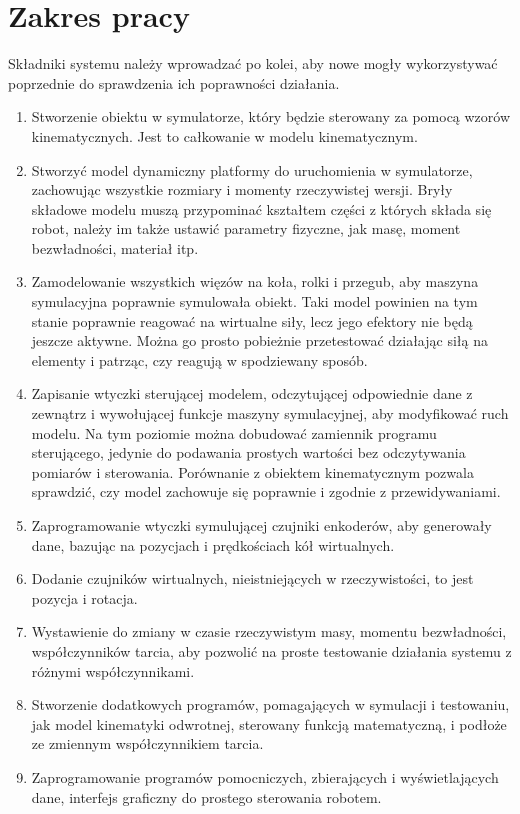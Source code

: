 \section{Zakres pracy}
	Składniki systemu należy wprowadzać po kolei, aby nowe mogły wykorzystywać poprzednie do sprawdzenia ich poprawności działania.
	\begin{enumerate}
	\item Stworzenie obiektu w symulatorze, który będzie sterowany za pomocą wzorów kinematycznych. Jest to całkowanie w modelu kinematycznym.
	\item Stworzyć model dynamiczny platformy do uruchomienia w symulatorze, zachowując wszystkie rozmiary i momenty rzeczywistej wersji.
	Bryły składowe modelu muszą przypominać kształtem części z których składa się robot, należy im także ustawić parametry fizyczne, jak masę, moment bezwładności, materiał itp.
	\item Zamodelowanie wszystkich więzów na koła, rolki i przegub, aby maszyna symulacyjna poprawnie symulowała obiekt.
	Taki model powinien na tym stanie poprawnie reagować na wirtualne siły, lecz jego efektory nie będą jeszcze aktywne.
	Można go prosto pobieżnie przetestować działając siłą na elementy i patrząc, czy reagują w spodziewany sposób.
	\item Zapisanie wtyczki sterującej modelem, odczytującej odpowiednie dane z zewnątrz i wywołującej funkcje maszyny symulacyjnej, aby modyfikować ruch modelu.
	Na tym poziomie można dobudować zamiennik programu sterującego, jedynie do podawania prostych wartości bez odczytywania pomiarów i sterowania.
	Porównanie z obiektem kinematycznym pozwala sprawdzić, czy model zachowuje się poprawnie i zgodnie z przewidywaniami.
	\item Zaprogramowanie wtyczki symulującej czujniki enkoderów, aby generowały dane, bazując na pozycjach i prędkościach kół wirtualnych.
	\item Dodanie czujników wirtualnych, nieistniejących w rzeczywistości, to jest pozycja i rotacja.
	\item Wystawienie do zmiany w czasie rzeczywistym masy, momentu bezwładności, współczynników tarcia, aby pozwolić na proste testowanie działania systemu z różnymi współczynnikami.
	\item Stworzenie dodatkowych programów, pomagających w symulacji i testowaniu, jak model kinematyki odwrotnej, sterowany funkcją matematyczną, i podłoże ze zmiennym współczynnikiem tarcia.
	\item Zaprogramowanie programów pomocniczych, zbierających i wyświetlających dane, interfejs graficzny do prostego sterowania robotem.

\end{enumerate}
